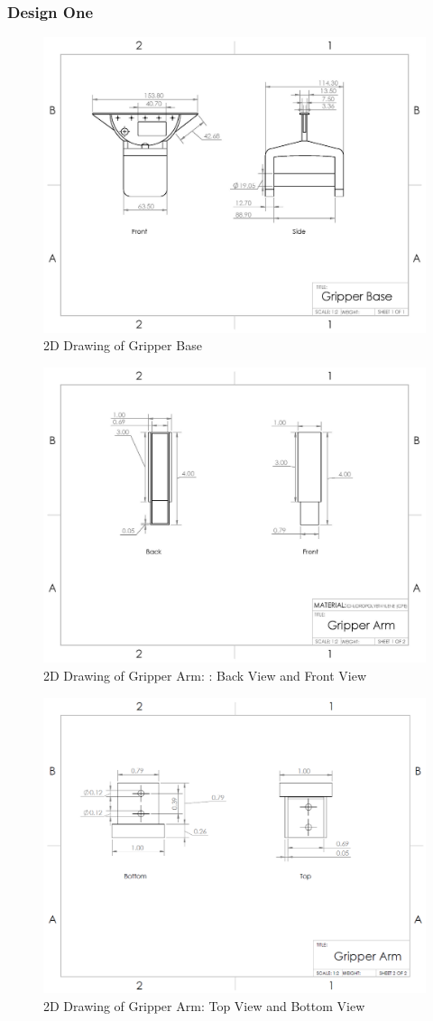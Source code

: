 \documentclass[11.5pt]{article}
\begin{document}
\subsubsection{Design One}
\begin{figure}[H]
    \centering
    \includegraphics[width=0.75\columnwidth]{2d/Base-page-001.jpg}
    \caption{2D Drawing of Gripper Base}
    \label{RLDiagram}
\end{figure}
\begin{figure}[H]
    \centering
    \includegraphics[width=0.75\columnwidth]{2d/Arm-page-001.jpg}
    \caption{2D Drawing of Gripper Arm: : Back View and Front View}
    \label{RLDiagram}
\end{figure}
\begin{figure}[H]
    \centering
    \includegraphics[width=0.75\columnwidth]{2d/Screenshot (53).png}
    \caption{2D Drawing of Gripper Arm: Top View and Bottom View}
    \label{RLDiagram}
\end{figure}
\end{document}
